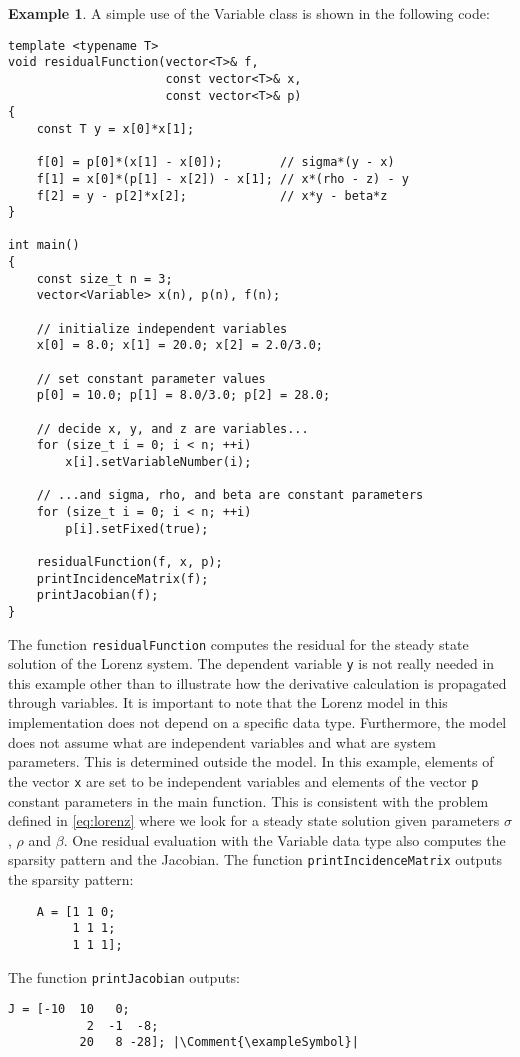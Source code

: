 \documentclass[10pt]{ijnam}
\newcommand*{\Comment}[1]{\hfill #1 }
\theoremstyle{definition}
\newtheorem{example}{Example}[section]
\newcommand\xqed[1]{\leavevmode\unskip\penalty9999 \hbox{}\nobreak\hfill \quad\hbox{#1}}
\newcommand{\exampleSymbol}{\xqed{$\triangle$}}
\begin{document}
\begin{example}
A simple use of the Variable class is shown in the following code:
\begin{lstlisting}
template <typename T>
void residualFunction(vector<T>& f,
                      const vector<T>& x,
                      const vector<T>& p)
{
    const T y = x[0]*x[1];
    
    f[0] = p[0]*(x[1] - x[0]);        // sigma*(y - x)
    f[1] = x[0]*(p[1] - x[2]) - x[1]; // x*(rho - z) - y
    f[2] = y - p[2]*x[2];             // x*y - beta*z
}

int main()
{
    const size_t n = 3;
    vector<Variable> x(n), p(n), f(n);
    
    // initialize independent variables
    x[0] = 8.0; x[1] = 20.0; x[2] = 2.0/3.0;    
    
    // set constant parameter values
    p[0] = 10.0; p[1] = 8.0/3.0; p[2] = 28.0;
    
    // decide x, y, and z are variables... 
    for (size_t i = 0; i < n; ++i)
        x[i].setVariableNumber(i);
    
    // ...and sigma, rho, and beta are constant parameters    
    for (size_t i = 0; i < n; ++i)
        p[i].setFixed(true);
    
    residualFunction(f, x, p);
    printIncidenceMatrix(f);
    printJacobian(f);
}
\end{lstlisting}  
The function \texttt{residualFunction} computes the residual for the steady state solution of the Lorenz system. The dependent variable \texttt{y} is not really needed in this example other than to illustrate how the derivative calculation is propagated through variables. It is important to note that the Lorenz model in this implementation does not depend on a specific data type. Furthermore, the model does not assume what are independent variables and what are system parameters. This is determined outside the model. In this example, elements of the vector \texttt{x} are set to be independent variables and elements of the vector \texttt{p} constant parameters in the main function. This is consistent with the problem defined in \eqref{eq:lorenz} where we look for a steady state solution given parameters $ \sigma $, $ \rho $ and $ \beta $.
One residual evaluation with the Variable data type also computes the sparsity pattern and the Jacobian. The function \texttt{printIncidenceMatrix} outputs the sparsity pattern:
\begin{lstlisting}
    A = [1 1 0;
         1 1 1;
         1 1 1];
\end{lstlisting}
The function \texttt{printJacobian} outputs:
\begin{lstlisting}[mathescape]
    J = [-10  10   0;
           2  -1  -8;
          20   8 -28]; |\Comment{\exampleSymbol}|
\end{lstlisting}
\end{example}
\end{document}
